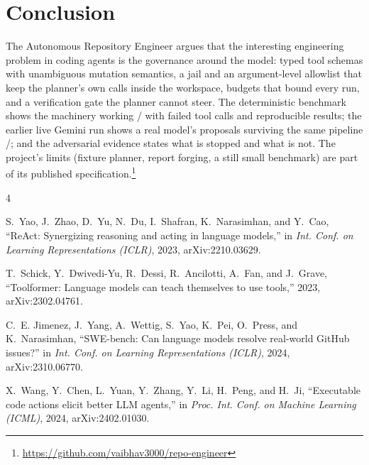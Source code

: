 \documentclass[conference]{IEEEtran}
\begin{document}
\section{Conclusion}
The Autonomous Repository Engineer argues that the interesting engineering
problem in coding agents is the governance around the model: typed tool
schemas with unambiguous mutation semantics, a jail and an argument-level
allowlist that keep the planner's own calls inside the workspace, budgets
that bound every run, and a verification gate the planner cannot steer. The
deterministic benchmark shows the machinery working
\BenchVerified/\BenchTasks{} with \BenchFailedCalls{} failed tool calls and
reproducible results; the earlier live Gemini run shows a real model's
proposals surviving the same pipeline \LiveVerified/\LiveTasks; and the adversarial
evidence states what is stopped and what is not. The project's limits
(fixture planner, report forging, a still small benchmark) are part of its
published specification.\footnote{\url{https://github.com/vaibhav3000/repo-engineer}}

\begin{thebibliography}{4}

S.~Yao, J.~Zhao, D.~Yu, N.~Du, I.~Shafran, K.~Narasimhan, and Y.~Cao,
``ReAct: Synergizing reasoning and acting in language models,'' in
\emph{Int. Conf. on Learning Representations (ICLR)}, 2023,
arXiv:2210.03629.

T.~Schick, Y.~Dwivedi-Yu, R.~Dessi, R.~Ancilotti, A.~Fan, and
J.~Grave, ``Toolformer: Language models can teach themselves to use
tools,'' 2023, arXiv:2302.04761.

C.~E. Jimenez, J.~Yang, A.~Wettig, S.~Yao, K.~Pei, O.~Press, and
K.~Narasimhan, ``SWE-bench: Can language models resolve real-world GitHub
issues?'' in \emph{Int. Conf. on Learning Representations (ICLR)}, 2024,
arXiv:2310.06770.

X.~Wang, Y.~Chen, L.~Yuan, Y.~Zhang, Y.~Li, H.~Peng, and H.~Ji,
``Executable code actions elicit better LLM agents,'' in \emph{Proc. Int.
Conf. on Machine Learning (ICML)}, 2024, arXiv:2402.01030.

\end{thebibliography}
\end{document}
